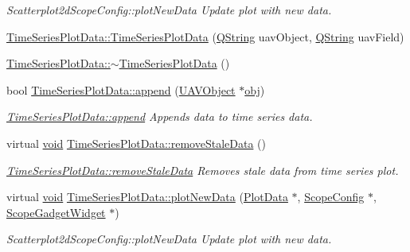 \begin{DoxyCompactItemize}
\begin{DoxyCompactList}\small\item\em Scatterplot2d\-Scope\-Config\-::plot\-New\-Data Update plot with new data. \end{DoxyCompactList}\item 
\hyperlink{group___scope_plugin_gaee4fb8258165729e7db0a3e37f619245}{Time\-Series\-Plot\-Data\-::\-Time\-Series\-Plot\-Data} (\hyperlink{group___u_a_v_objects_plugin_gab9d252f49c333c94a72f97ce3105a32d}{Q\-String} uav\-Object, \hyperlink{group___u_a_v_objects_plugin_gab9d252f49c333c94a72f97ce3105a32d}{Q\-String} uav\-Field)
\item 
\hyperlink{group___scope_plugin_gada4c361665eb2f78ad8768e8f25a9786}{Time\-Series\-Plot\-Data\-::$\sim$\-Time\-Series\-Plot\-Data} ()
\item 
bool \hyperlink{group___scope_plugin_ga35573edecad8799fae6df0ed2a47638a}{Time\-Series\-Plot\-Data\-::append} (\hyperlink{class_u_a_v_object}{U\-A\-V\-Object} $\ast$\hyperlink{glext_8h_a0c0d4701a6c89f4f7f0640715d27ab26}{obj})
\begin{DoxyCompactList}\small\item\em \hyperlink{group___scope_plugin_ga35573edecad8799fae6df0ed2a47638a}{Time\-Series\-Plot\-Data\-::append} Appends data to time series data. \end{DoxyCompactList}\item 
virtual \hyperlink{group___u_a_v_objects_plugin_ga444cf2ff3f0ecbe028adce838d373f5c}{void} \hyperlink{group___scope_plugin_gaed5772c910e2434ae0d99aee7d0fd829}{Time\-Series\-Plot\-Data\-::remove\-Stale\-Data} ()
\begin{DoxyCompactList}\small\item\em \hyperlink{group___scope_plugin_gaed5772c910e2434ae0d99aee7d0fd829}{Time\-Series\-Plot\-Data\-::remove\-Stale\-Data} Removes stale data from time series plot. \end{DoxyCompactList}\item 
virtual \hyperlink{group___u_a_v_objects_plugin_ga444cf2ff3f0ecbe028adce838d373f5c}{void} \hyperlink{group___scope_plugin_gab0866f798b0b322c20aa33e85a3a6296}{Time\-Series\-Plot\-Data\-::plot\-New\-Data} (\hyperlink{class_plot_data}{Plot\-Data} $\ast$, \hyperlink{class_scope_config}{Scope\-Config} $\ast$, \hyperlink{class_scope_gadget_widget}{Scope\-Gadget\-Widget} $\ast$)
\begin{DoxyCompactList}\small\item\em Scatterplot2d\-Scope\-Config\-::plot\-New\-Data Update plot with new data. \end{DoxyCompactList}\item 

\end{DoxyCompactItemize}
